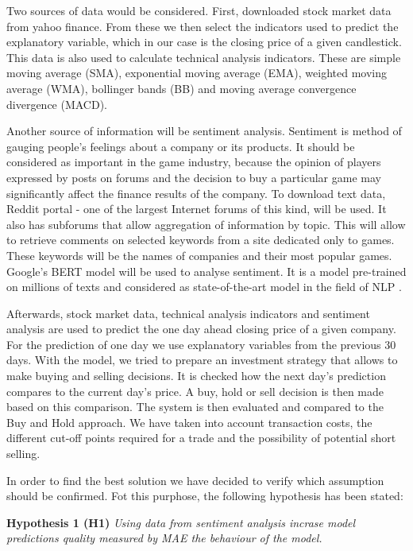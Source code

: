 \documentclass[11pt]{article} %
\begin{document}
Two sources of data would be considered. First, downloaded stock market data from yahoo finance. From these we then select the indicators used to predict the explanatory variable, which in our case is the closing price of a given candlestick. This data is also used to calculate technical analysis indicators. These are simple moving average (SMA), exponential moving average (EMA), weighted moving average (WMA), bollinger bands (BB) and moving average convergence divergence (MACD). 

Another source of information will be sentiment analysis. Sentiment is method of gauging people's feelings about a company or its products. It should be considered as important in the game industry, because the opinion of players expressed by posts on forums and the decision to buy a particular game may significantly affect the finance results of the company. To download text data, Reddit portal - one of the largest Internet forums of this kind, will be used. It also has subforums that allow aggregation of information by topic. This will allow to retrieve comments on selected keywords from a site dedicated only to games. These keywords will be the names of companies and their most popular games. Google's BERT model will be used to analyse sentiment. It is a model pre-trained on millions of texts and considered as state-of-the-art model in the field of NLP \cite{bert} \cite{s-gan}. 

Afterwards, stock market data, technical analysis indicators and sentiment analysis are used to predict the one day ahead closing price of a given company. For the prediction of one day we use explanatory variables from the previous 30 days. With the model, we tried to prepare an investment strategy that allows to make buying and selling decisions. It is checked how the next day's prediction compares to the current day's price. A buy, hold or sell decision is then made based on this comparison. The system is then evaluated and compared to the Buy and Hold approach. We have taken into account transaction costs, the different cut-off points required for a trade and the possibility of potential short selling. 

In order to find the best solution we have decided to verify which assumption should be confirmed. Fot this purphose, the following hypothesis has been stated: 

\textbf{Hypothesis 1 (H1)} \textit{Using data from sentiment analysis incrase model predictions quality measured by MAE the behaviour of the model.}
\end{document}
